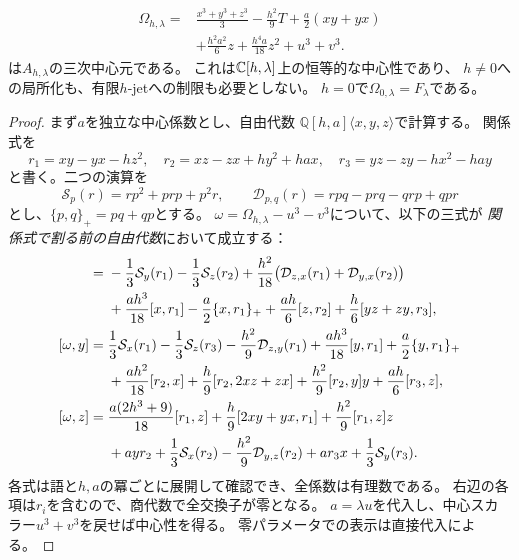 \begin{proposition}[混合試験族の中心元]
\label{mt:prop:center}
\begin{equation}\label{mt:eq:center}
 \boxed{\begin{aligned}
 \Omega_{h,\lambda}={}&
 \frac{x^3+y^3+z^3}{3}-\frac{h^2}{9}T
 +\frac a2(xy+yx)\\
 &+\frac{h^2a^2}{6}z+\frac{h^4a}{18}z^2+u^3+v^3.
 \end{aligned}}
\end{equation}
は$A_{h,\lambda}$の三次中心元である。
これは$\mathbb C[h,\lambda]$上の恒等的な中心性であり、
$h\ne0$への局所化も、有限$h$-jetへの制限も必要としない。
$h=0$で$\Omega_{0,\lambda}=F_\lambda$である。
\end{proposition}
\begin{proof}
まず$a$を独立な中心係数とし、自由代数
$\mathbb Q[h,a]\langle x,y,z\rangle$で計算する。
関係式を
\[
 r_1=xy-yx-hz^2,\quad
 r_2=xz-zx+hy^2+hax,\quad
 r_3=yz-zy-hx^2-hay
\]
と書く。二つの演算を
\[
 \mathcal S_p(r)=rp^2+prp+p^2r,\qquad
 \mathcal D_{p,q}(r)=rpq-prq-qrp+qpr
\]
とし、$\{p,q\}_+=pq+qp$とする。
$\omega=\Omega_{h,\lambda}-u^3-v^3$について、以下の三式が
\emph{関係式で割る前の自由代数}において成立する：
\begin{align}
 [\omega,x]={}&
 -\frac13\mathcal S_y(r_1)-\frac13\mathcal S_z(r_2)
 +\frac{h^2}{18}
   \bigl(\mathcal D_{z,x}(r_1)+\mathcal D_{y,x}(r_2)\bigr)\notag\\
 &+\frac{ah^3}{18}[x,r_1]-\frac a2\{x,r_1\}_+
  +\frac{ah}{6}[z,r_2]+
  \frac h6[yz+zy,r_3],\label{mt:eq:certificate-x}\\
 [\omega,y]={}&
 \frac13\mathcal S_x(r_1)-\frac13\mathcal S_z(r_3)
 -\frac{h^2}{9}\mathcal D_{z,y}(r_1)
 +\frac{ah^3}{18}[y,r_1]+\frac a2\{y,r_1\}_+\notag\\
 &+\frac{ah^2}{18}[r_2,x]+\frac h9[r_2,2xz+zx]
 +\frac{h^2}{9}[r_2,y]y+\frac{ah}{6}[r_3,z],
 \label{mt:eq:certificate-y}\\
 [\omega,z]={}&
 \frac{a(2h^3+9)}{18}[r_1,z]
 +\frac h9[2xy+yx,r_1]+\frac{h^2}{9}[r_1,z]z\notag\\
 &+ayr_2+\frac13\mathcal S_x(r_2)
 -\frac{h^2}{9}\mathcal D_{y,z}(r_2)
 +ar_3x+\frac13\mathcal S_y(r_3).
 \label{mt:eq:certificate-z}
\end{align}
各式は語と$h,a$の冪ごとに展開して確認でき、全係数は有理数である。
右辺の各項は$r_i$を含むので、商代数で全交換子が零となる。
$a=\lambda u$を代入し、中心スカラー$u^3+v^3$を戻せば中心性を得る。
零パラメータでの表示は直接代入による。
\end{proof}

